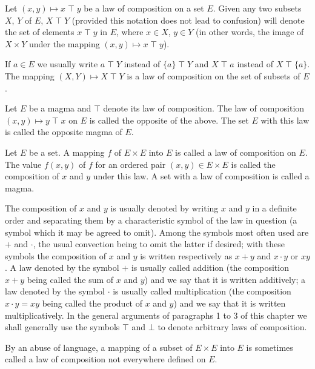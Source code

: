 \documentclass[twoside,usebookdim]{bourbaki}
\begin{document}
Let $(x,y)\mapsto x\mathbin{\top} y$ be a law of composition on a set $E$. Given
any two subsets $X$, $Y$ of $E$, $X \mathbin{\top} Y$ (provided this notation does
not lead to confusion) will denote the set of elements $x\mathbin{\top} y$ in $E$,
where $x\in X$, $y\in Y$ (in other words, the image of $X\times Y$ under
the mapping $(x,y)\mapsto x\mathbin{\top} y$).

If $a\in E$ we usually write $a\mathbin{\top} Y$ instead of $\{a\}\mathbin{\top} Y$ and
$X\mathbin{\top} a$ instead of $X\mathbin{\top}\{a\}$. The mapping $(X, Y)\mapsto X\mathbin{\top} Y$
is a law of composition on the set of subsets of $E$.

\begin{definition}
Let $E$ be a magma and $\mathbin{\top}$ denote its law of composition. The law of
composition $(x, y)\mapsto y\mathbin{\top} x$ on $E$ is called the opposite of the
above. The set $E$ with this law is called the opposite magma of $E$.
\end{definition}


\begin{definition}
Let $E$ be a set. A mapping $f$ of $E\times E$ into $E$ is called a law
of composition on $E$. The value $f(x,y)$ of $f$ for an ordered pair
$(x,y)\in E\times E$ is called the composition of $x$ and $y$ under this
law. A set with a law of composition is called a magma.
\end{definition}

The composition of $x$ and $y$ is usually denoted by writing $x$ and $y$
in a definite order and separating them by a characteristic symbol of
the law in question (a symbol which it may be agreed to omit). Among the
symbols most often used are $+$ and $\cdot$, the usual convection being
to omit the latter if desired; with these symbols the composition of $x$
and $y$ is written respectively as $x + y$ and $x\cdot y$ or $xy$.
A law denoted by the symbol $+$ is usually called addition (the
composition $x + y$ being called the sum of $x$ and $y$) and we say that
it is written additively; a law denoted by the symbol $\cdot$ is usually
called multiplication (the composition $x\cdot y = xy$ being called the
product of $x$ and $y$) and we say that it is written
multiplicatively. In the general arguments of paragraphs 1 to 3 of this
chapter we shall generally use the symbols $\mathbin{\top}$ and $\bot$ to denote
arbitrary laws of composition.

By an abuse of language, a mapping of a subset of $E\times E$ into $E$
is sometimes called a law of composition not everywhere defined on $E$.
\end{document}
